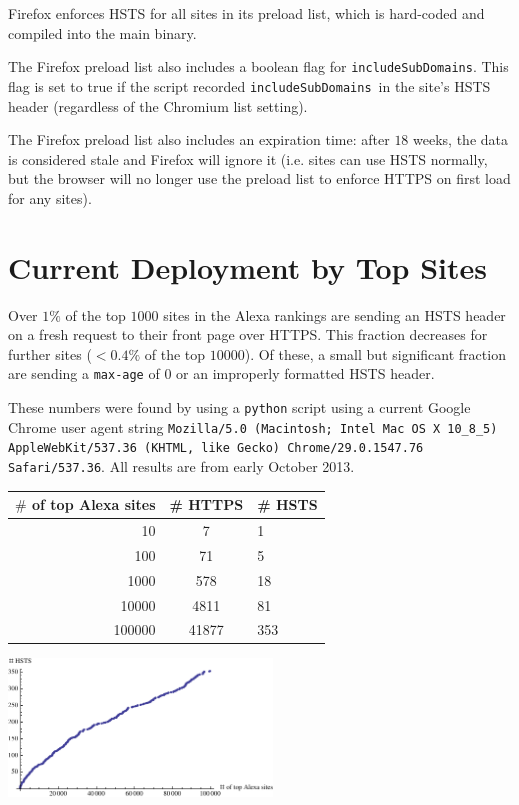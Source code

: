 \documentclass[conference]{./IEEEtran}
\newcommand{\code}[1]{\texttt{#1}}
\newcommand{\iSD}{{\code{includeSubDomains}}}
\theoremstyle{plain}
\begin{document}
Firefox enforces HSTS for all sites in its preload list, which is hard-coded and compiled into the main binary.

The Firefox preload list also includes a boolean flag for \iSD. This flag is set to true if the script recorded \iSD~in the site's HSTS header (regardless of the Chromium list setting).

The Firefox preload list also includes an expiration time: after $18$ weeks, the data is considered stale and Firefox will ignore it (i.e. sites can use HSTS normally, but the browser will no longer use the preload list to enforce HTTPS on first load for any sites)\cite{firefox-cron-expiration}.

\section{Current Deployment by Top Sites}

Over $1\%$ of the top $1000$ sites in the Alexa rankings are sending an HSTS header on a fresh request to their front page over HTTPS. This fraction decreases for further sites ($< 0.4\%$ of the top $10000$). Of these, a small but significant fraction are sending a \code{max-age} of $0$ or an improperly formatted HSTS header.

These numbers were found by using a \code{python} script using a current Google Chrome user agent string \code{Mozilla/5.0 (Macintosh; Intel Mac OS X 10\_8\_5) AppleWebKit/537.36 (KHTML, like Gecko) Chrome/29.0.1547.76 Safari/537.36}. All results are from early October 2013.

\begin{table}[htdp]
\label{alexa_table}
\begin{center}
\begin{tabular}{|r|c|l|}
\hline
$\#$ of top Alexa sites & \# HTTPS & \# HSTS\\
\hline
10 & 7 & 1 \\
\hline
100 & 71 & 5 \\	
\hline
1000 & 578 & 18 \\
\hline
10000 & 4811 & 81\\
\hline
100000 & 41877 & 353\\
\hline
\end{tabular}
\end{center}
\end{table}%

\begin{center}
\includegraphics[width=70mm]{alexa_hsts.pdf}
\end{center}
\end{document}
